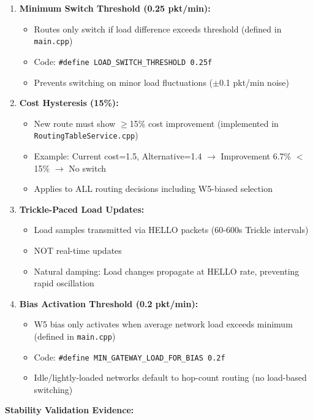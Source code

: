 \begin{enumerate}
\item \textbf{Minimum Switch Threshold (0.25 pkt/min):}
   \begin{itemize}
   \item Routes only switch if load difference exceeds threshold (defined in \texttt{main.cpp})
   \item Code: \texttt{\#define LOAD\_SWITCH\_THRESHOLD 0.25f}
   \item Prevents switching on minor load fluctuations ($\pm$0.1 pkt/min noise)
   \end{itemize}

\item \textbf{Cost Hysteresis (15\%):}
   \begin{itemize}
   \item New route must show $\geq$15\% cost improvement (implemented in \texttt{RoutingTableService.cpp})
   \item Example: Current cost=1.5, Alternative=1.4 $\rightarrow$ Improvement 6.7\% $<$ 15\% $\rightarrow$ No switch
   \item Applies to ALL routing decisions including W5-biased selection
   \end{itemize}

\item \textbf{Trickle-Paced Load Updates:}
   \begin{itemize}
   \item Load samples transmitted via HELLO packets (60-600s Trickle intervals)
   \item NOT real-time updates
   \item Natural damping: Load changes propagate at HELLO rate, preventing rapid oscillation
   \end{itemize}

\item \textbf{Bias Activation Threshold (0.2 pkt/min):}
   \begin{itemize}
   \item W5 bias only activates when average network load exceeds minimum (defined in \texttt{main.cpp})
   \item Code: \texttt{\#define MIN\_GATEWAY\_LOAD\_FOR\_BIAS 0.2f}
   \item Idle/lightly-loaded networks default to hop-count routing (no load-based switching)
   \end{itemize}
\end{enumerate}

\textbf{Stability Validation Evidence:}

